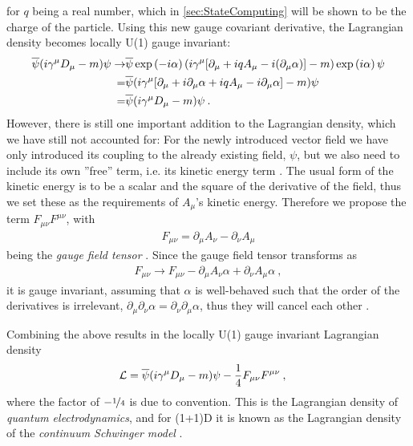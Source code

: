 \documentclass[../main.tex]{subfiles} %
\begin{document}
for $q$ being a real number, which in \cref{sec:StateComputing} will be shown to be the charge of the particle. Using this new gauge covariant derivative, the Lagrangian density becomes locally U(1) gauge invariant:
\begin{align}
\begin{split}
    \psibar (i \gamma^\mu D_\mu - m) \psi \rightarrow
        & \psibar \exp{-i\alpha} (i \gamma^\mu [\partial_\mu + iqA_\mu - i(\partial_\mu\alpha)] - m) \exp{i\alpha} \psi \\
        =& \psibar (i \gamma^\mu [\partial_\mu + i \partial_\mu \alpha + iqA_\mu - i\partial_\mu\alpha] - m) \psi \\
        =& \psibar (i \gamma^\mu D_\mu - m) \psi \: .
\end{split}
\end{align}
However, there is still one important addition to the Lagrangian density, which we have still not accounted for: For the newly introduced vector field we have only introduced its coupling to the already existing field, $\psi$, but we also need to include its own ''free'' term, i.e. its kinetic energy term \cite{griffiths_introToElementaryParticles_2008}. The usual form of the kinetic energy is to be a scalar and the square of the derivative of the field, thus we set these as the requirements of $A_\mu$'s kinetic energy. Therefore we propose the term $F_{\mu\nu}F^{\mu\nu}$, with
\begin{align}
    F_{\mu\nu} = \partial_\mu A_\nu - \partial_\nu A_\mu
\end{align}
being the \emph{gauge field tensor} \cite{griffiths_introToEldyn_2017}. Since the gauge field tensor transforms as
\begin{align}
    F_{\mu\nu} \rightarrow F_{\mu\nu} - \partial_\mu A_\nu \alpha + \partial_\nu A_\mu \alpha \: ,
\end{align}
it is gauge invariant, assuming that $\alpha$ is well-behaved such that the order of the derivatives is irrelevant, $\partial_\mu\partial_\nu\alpha = \partial_\nu\partial_\mu\alpha$, thus they will cancel each other \cite{panyella_masterThesis_2019}.

Combining the above results in the locally U(1) gauge invariant Lagrangian density
\begin{align} \label{eq:ContinuumSchwingerModelLagrangianDensity}
    \mathcal{L} &= \overline{\psi} (i \gamma^\mu D_\mu - m) \psi - \frac{1}{4}F_{\mu\nu}F^{\mu\nu} \: ,
\end{align}
where the factor of $-\nicefrac{1}{4}$ is due to convention. This is the Lagrangian density of \emph{quantum electrodynamics}, and for (1+1)D it is known as the Lagrangian density of the \emph{continuum Schwinger model} \cite{melnikov_latticeSchwingerModel_2000, buyens_confinementAndStringBreaking_2016}.
\end{document}
